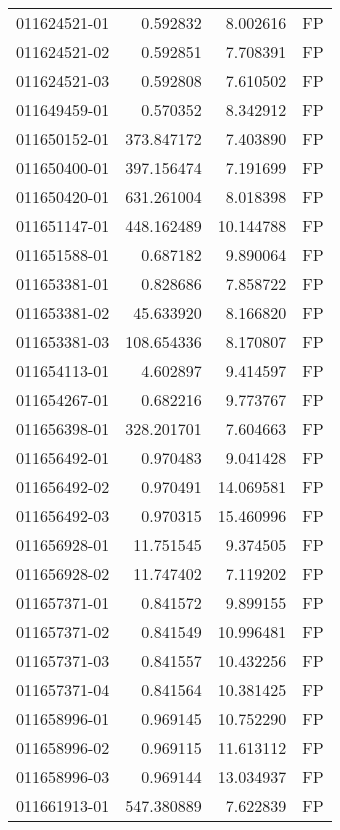 \begin{tabular}{lrrl}
011624521-01 &    0.592832 &       8.002616 &   FP \\
011624521-02 &    0.592851 &       7.708391 &   FP \\
011624521-03 &    0.592808 &       7.610502 &   FP \\
011649459-01 &    0.570352 &       8.342912 &   FP \\
011650152-01 &  373.847172 &       7.403890 &   FP \\
011650400-01 &  397.156474 &       7.191699 &   FP \\
011650420-01 &  631.261004 &       8.018398 &   FP \\
011651147-01 &  448.162489 &      10.144788 &   FP \\
011651588-01 &    0.687182 &       9.890064 &   FP \\
011653381-01 &    0.828686 &       7.858722 &   FP \\
011653381-02 &   45.633920 &       8.166820 &   FP \\
011653381-03 &  108.654336 &       8.170807 &   FP \\
011654113-01 &    4.602897 &       9.414597 &   FP \\
011654267-01 &    0.682216 &       9.773767 &   FP \\
011656398-01 &  328.201701 &       7.604663 &   FP \\
011656492-01 &    0.970483 &       9.041428 &   FP \\
011656492-02 &    0.970491 &      14.069581 &   FP \\
011656492-03 &    0.970315 &      15.460996 &   FP \\
011656928-01 &   11.751545 &       9.374505 &   FP \\
011656928-02 &   11.747402 &       7.119202 &   FP \\
011657371-01 &    0.841572 &       9.899155 &   FP \\
011657371-02 &    0.841549 &      10.996481 &   FP \\
011657371-03 &    0.841557 &      10.432256 &   FP \\
011657371-04 &    0.841564 &      10.381425 &   FP \\
011658996-01 &    0.969145 &      10.752290 &   FP \\
011658996-02 &    0.969115 &      11.613112 &   FP \\
011658996-03 &    0.969144 &      13.034937 &   FP \\
011661913-01 &  547.380889 &       7.622839 &   FP \\

\end{tabular}
